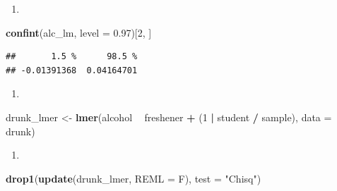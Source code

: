 \documentclass[]{book}
\newenvironment{Shaded}{\begin{snugshade}}{\end{snugshade}}
\newcommand{\KeywordTok}[1]{\textcolor[rgb]{0.13,0.29,0.53}{\textbf{#1}}}
\newcommand{\DataTypeTok}[1]{\textcolor[rgb]{0.13,0.29,0.53}{#1}}
\newcommand{\DecValTok}[1]{\textcolor[rgb]{0.00,0.00,0.81}{#1}}
\newcommand{\FloatTok}[1]{\textcolor[rgb]{0.00,0.00,0.81}{#1}}
\newcommand{\StringTok}[1]{\textcolor[rgb]{0.31,0.60,0.02}{#1}}
\newcommand{\OperatorTok}[1]{\textcolor[rgb]{0.81,0.36,0.00}{\textbf{#1}}}
\newcommand{\NormalTok}[1]{#1}
\theoremstyle{definition}
\theoremstyle{definition}
\theoremstyle{definition}
\theoremstyle{remark}
\begin{document}
\normalsize

\begin{enumerate}
\def\labelenumi{\arabic{enumi}.}
\setcounter{enumi}{1}
\item
\end{enumerate}

\small

\begin{Shaded}
\begin{Highlighting}[]
\KeywordTok{confint}\NormalTok{(alc_lm, }\DataTypeTok{level =} \FloatTok{0.97}\NormalTok{)[}\DecValTok{2}\NormalTok{, ]}
\end{Highlighting}
\end{Shaded}

\begin{verbatim}
##       1.5 %      98.5 % 
## -0.01391368  0.04164701
\end{verbatim}

\normalsize

\begin{enumerate}
\def\labelenumi{\arabic{enumi}.}
\setcounter{enumi}{2}
\item
\end{enumerate}

\small

\begin{Shaded}
\begin{Highlighting}[]
\NormalTok{drunk_lmer <-}\StringTok{ }\KeywordTok{lmer}\NormalTok{(alcohol }\OperatorTok{~}\StringTok{ }\NormalTok{freshener }\OperatorTok{+}\StringTok{ }
\StringTok{    }\NormalTok{(}\DecValTok{1} \OperatorTok{|}\StringTok{ }\NormalTok{student }\OperatorTok{/}\StringTok{ }\NormalTok{sample), }\DataTypeTok{data =}\NormalTok{ drunk)}
\end{Highlighting}
\end{Shaded}

\normalsize

\begin{enumerate}
\def\labelenumi{\arabic{enumi}.}
\setcounter{enumi}{3}
\item
\end{enumerate}

\scriptsize

\begin{Shaded}
\begin{Highlighting}[]
\KeywordTok{drop1}\NormalTok{(}\KeywordTok{update}\NormalTok{(drunk_lmer, }\DataTypeTok{REML =}\NormalTok{ F), }
    \DataTypeTok{test =} \StringTok{"Chisq"}\NormalTok{)}
\end{Highlighting}
\end{Shaded}
\end{document}
